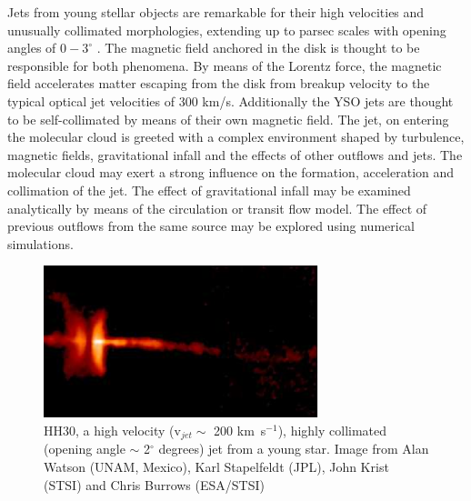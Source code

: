 Jets from young stellar objects  are remarkable for
their high velocities and unusually collimated morphologies, extending
up to parsec scales with opening angles of $0-3^{\circ}$
\citep{2000prpl.conf..815E}. 
The magnetic field anchored in the disk is thought to be responsible for both phenomena.
By means of the Lorentz force, the magnetic field accelerates matter escaping from the disk from breakup velocity to the typical optical jet velocities of 300 km/s.
Additionally the YSO jets are thought to be self-collimated by means of their own magnetic field.
The jet, on entering the molecular cloud is greeted with a complex environment shaped by turbulence, magnetic fields, gravitational infall and the effects of other outflows and jets.
The molecular cloud may exert a strong influence on the formation, acceleration and collimation of the jet.
The effect of gravitational infall may be examined analytically by means of the circulation or transit flow model.
The effect of previous outflows from the same source may be explored using numerical simulations.





\begin{figure}[t]
\centering
\includegraphics[width=8cm]{CollimatedJet}
\caption{
HH30, a high velocity (v$_{jet} \sim$ 200 km~s$^{-1}$), highly collimated (opening angle $\sim$ 2$^{\circ}$ degrees) jet from a young star.
Image from Alan Watson (UNAM, Mexico), Karl Stapelfeldt (JPL), John Krist (STSI) and Chris Burrows (ESA/STSI)
}
\label{fig:5-01}       %
\end{figure}


